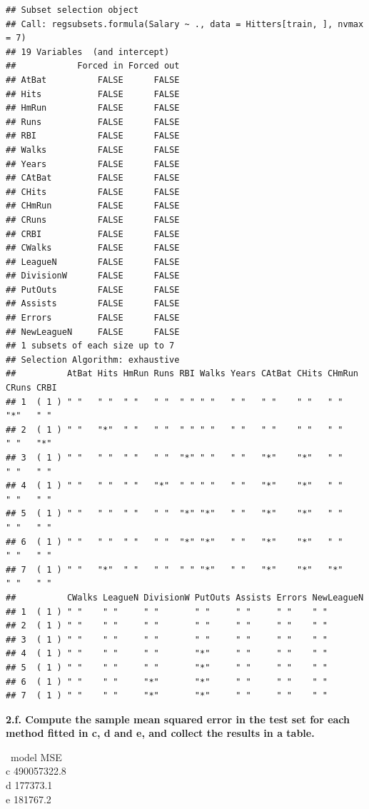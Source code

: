 \documentclass[
]{article}
\begin{document}
\begin{verbatim}
## Subset selection object
## Call: regsubsets.formula(Salary ~ ., data = Hitters[train, ], nvmax = 7)
## 19 Variables  (and intercept)
##            Forced in Forced out
## AtBat          FALSE      FALSE
## Hits           FALSE      FALSE
## HmRun          FALSE      FALSE
## Runs           FALSE      FALSE
## RBI            FALSE      FALSE
## Walks          FALSE      FALSE
## Years          FALSE      FALSE
## CAtBat         FALSE      FALSE
## CHits          FALSE      FALSE
## CHmRun         FALSE      FALSE
## CRuns          FALSE      FALSE
## CRBI           FALSE      FALSE
## CWalks         FALSE      FALSE
## LeagueN        FALSE      FALSE
## DivisionW      FALSE      FALSE
## PutOuts        FALSE      FALSE
## Assists        FALSE      FALSE
## Errors         FALSE      FALSE
## NewLeagueN     FALSE      FALSE
## 1 subsets of each size up to 7
## Selection Algorithm: exhaustive
##          AtBat Hits HmRun Runs RBI Walks Years CAtBat CHits CHmRun CRuns CRBI
## 1  ( 1 ) " "   " "  " "   " "  " " " "   " "   " "    " "   " "    "*"   " " 
## 2  ( 1 ) " "   "*"  " "   " "  " " " "   " "   " "    " "   " "    " "   "*" 
## 3  ( 1 ) " "   " "  " "   " "  "*" " "   " "   "*"    "*"   " "    " "   " " 
## 4  ( 1 ) " "   " "  " "   "*"  " " " "   " "   "*"    "*"   " "    " "   " " 
## 5  ( 1 ) " "   " "  " "   " "  "*" "*"   " "   "*"    "*"   " "    " "   " " 
## 6  ( 1 ) " "   " "  " "   " "  "*" "*"   " "   "*"    "*"   " "    " "   " " 
## 7  ( 1 ) " "   "*"  " "   " "  " " "*"   " "   "*"    "*"   "*"    " "   " " 
##          CWalks LeagueN DivisionW PutOuts Assists Errors NewLeagueN
## 1  ( 1 ) " "    " "     " "       " "     " "     " "    " "       
## 2  ( 1 ) " "    " "     " "       " "     " "     " "    " "       
## 3  ( 1 ) " "    " "     " "       " "     " "     " "    " "       
## 4  ( 1 ) " "    " "     " "       "*"     " "     " "    " "       
## 5  ( 1 ) " "    " "     " "       "*"     " "     " "    " "       
## 6  ( 1 ) " "    " "     "*"       "*"     " "     " "    " "       
## 7  ( 1 ) " "    " "     "*"       "*"     " "     " "    " "
\end{verbatim}

\textbf{2.f. Compute the sample mean squared error in the test set for
each method fitted in c, d and e, and collect the results in a table.}

~model \textbar{} MSE \textbar{}\\
c \textbar{} 490057322.8 \textbar{}\\
d \textbar{} 177373.1 \textbar{}\\
e \textbar{} 181767.2 \textbar{}
\end{document}
